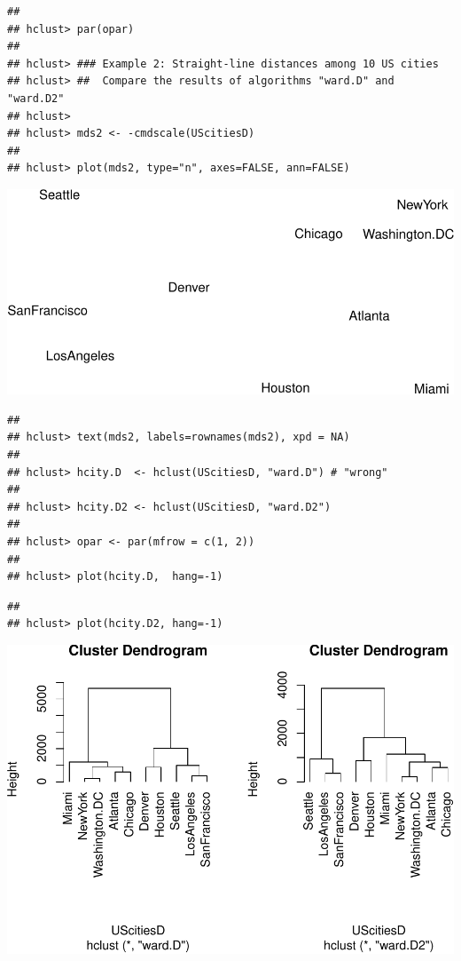 \documentclass[
]{book}
\begin{document}
\begin{verbatim}
## 
## hclust> par(opar)
## 
## hclust> ### Example 2: Straight-line distances among 10 US cities
## hclust> ##  Compare the results of algorithms "ward.D" and "ward.D2"
## hclust> 
## hclust> mds2 <- -cmdscale(UScitiesD)
## 
## hclust> plot(mds2, type="n", axes=FALSE, ann=FALSE)
\end{verbatim}

\includegraphics{bookdown-demo_files/figure-latex/unnamed-chunk-11-4.pdf}

\begin{verbatim}
## 
## hclust> text(mds2, labels=rownames(mds2), xpd = NA)
## 
## hclust> hcity.D  <- hclust(UScitiesD, "ward.D") # "wrong"
## 
## hclust> hcity.D2 <- hclust(UScitiesD, "ward.D2")
## 
## hclust> opar <- par(mfrow = c(1, 2))
## 
## hclust> plot(hcity.D,  hang=-1)
\end{verbatim}

\begin{verbatim}
## 
## hclust> plot(hcity.D2, hang=-1)
\end{verbatim}

\includegraphics{bookdown-demo_files/figure-latex/unnamed-chunk-11-5.pdf}
\end{document}
